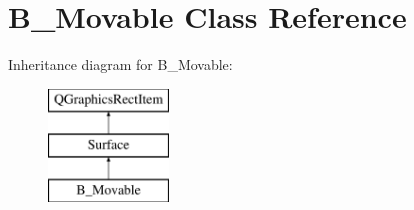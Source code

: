 \hypertarget{class_b___movable}{}\section{B\+\_\+\+Movable Class Reference}
\label{class_b___movable}
Inheritance diagram for B\+\_\+\+Movable\+:\begin{figure}[H]
\begin{center}
\leavevmode
\includegraphics[height=3.000000cm]{class_b___movable}
\end{center}
\end{figure}
